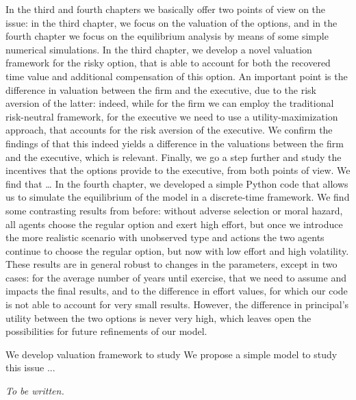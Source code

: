 In the third and fourth chapters we basically offer two points of view on the issue: in the third chapter, we focus on the valuation of the options, and in the fourth chapter we focus on the equilibrium analysis by means of some simple numerical simulations. In the third chapter, we develop a novel valuation framework for the risky option, that is able to account for both the recovered time value and additional compensation of this option. An important point is the difference in valuation between the firm and the executive, due to the risk aversion of the latter: indeed, while for the firm we can employ the traditional risk-neutral framework, for the executive we need to use a utility-maximization approach, that accounts for the risk aversion of the executive. We confirm the findings of \cite{carpenter1998exercise} that this indeed yields a difference in the valuations between the firm and the executive, which is relevant. Finally, we go a step further and study the incentives that the options provide to the executive, from both points of view. We find that \dots
In the fourth chapter, we developed a simple Python code that allows us to simulate the equilibrium of the model in a discrete-time framework. We find some contrasting results from before: without adverse selection or moral hazard, all agents choose the regular option and exert high effort, but once we introduce the more realistic scenario with unobserved type and actions the two agents continue to choose the regular option, but now with low effort and high volatility. These results are in general robust to changes in the parameters, except in two cases: for the average number of years until exercise, that we need to assume and impacts the final results, and to the difference in effort values, for which our code is not able to account for very small results. However, the difference in principal's utility between the two options is never very high, which leaves open the possibilities for future refinements of our model.




We develop valuation framework to study 
We propose a simple model to study this issue ...


\textit{To be written.}